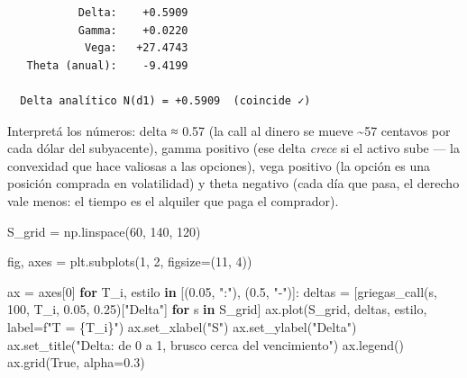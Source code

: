 \documentclass[
  spanish,
  letterpaper,
  DIV=11,
  numbers=noendperiod]{scrreprt}
\newenvironment{Shaded}{\begin{snugshade}}{\end{snugshade}}
\newcommand{\ControlFlowTok}[1]{\textcolor[rgb]{0.00,0.23,0.31}{\textbf{#1}}}
\newcommand{\DecValTok}[1]{\textcolor[rgb]{0.68,0.00,0.00}{#1}}
\newcommand{\FloatTok}[1]{\textcolor[rgb]{0.68,0.00,0.00}{#1}}
\newcommand{\KeywordTok}[1]{\textcolor[rgb]{0.00,0.23,0.31}{\textbf{#1}}}
\newcommand{\NormalTok}[1]{\textcolor[rgb]{0.00,0.23,0.31}{#1}}
\newcommand{\OperatorTok}[1]{\textcolor[rgb]{0.37,0.37,0.37}{#1}}
\newcommand{\SpecialCharTok}[1]{\textcolor[rgb]{0.37,0.37,0.37}{#1}}
\newcommand{\SpecialStringTok}[1]{\textcolor[rgb]{0.13,0.47,0.30}{#1}}
\newcommand{\StringTok}[1]{\textcolor[rgb]{0.13,0.47,0.30}{#1}}
\newcommand{\VariableTok}[1]{\textcolor[rgb]{0.07,0.07,0.07}{#1}}
\begin{document}
\begin{verbatim}
           Delta:    +0.5909
           Gamma:    +0.0220
            Vega:   +27.4743
   Theta (anual):    -9.4199

  Delta analítico N(d1) = +0.5909  (coincide ✓)
\end{verbatim}

Interpretá los números: delta ≈ 0.57 (la call al dinero se mueve
\textasciitilde57 centavos por cada dólar del subyacente), gamma
positivo (ese delta \emph{crece} si el activo sube --- la convexidad que
hace valiosas a las opciones), vega positivo (la opción es una posición
comprada en volatilidad) y theta negativo (cada día que pasa, el derecho
vale menos: el tiempo es el alquiler que paga el comprador).

\begin{Shaded}
\begin{Highlighting}[]
\NormalTok{S\_grid }\OperatorTok{=}\NormalTok{ np.linspace(}\DecValTok{60}\NormalTok{, }\DecValTok{140}\NormalTok{, }\DecValTok{120}\NormalTok{)}

\NormalTok{fig, axes }\OperatorTok{=}\NormalTok{ plt.subplots(}\DecValTok{1}\NormalTok{, }\DecValTok{2}\NormalTok{, figsize}\OperatorTok{=}\NormalTok{(}\DecValTok{11}\NormalTok{, }\DecValTok{4}\NormalTok{))}

\NormalTok{ax }\OperatorTok{=}\NormalTok{ axes[}\DecValTok{0}\NormalTok{]}
\ControlFlowTok{for}\NormalTok{ T\_i, estilo }\KeywordTok{in}\NormalTok{ [(}\FloatTok{0.05}\NormalTok{, }\StringTok{":"}\NormalTok{), (}\FloatTok{0.5}\NormalTok{, }\StringTok{"{-}"}\NormalTok{)]:}
\NormalTok{    deltas }\OperatorTok{=}\NormalTok{ [griegas\_call(s, }\DecValTok{100}\NormalTok{, T\_i, }\FloatTok{0.05}\NormalTok{, }\FloatTok{0.25}\NormalTok{)[}\StringTok{"Delta"}\NormalTok{] }\ControlFlowTok{for}\NormalTok{ s }\KeywordTok{in}\NormalTok{ S\_grid]}
\NormalTok{    ax.plot(S\_grid, deltas, estilo, label}\OperatorTok{=}\SpecialStringTok{f"T = }\SpecialCharTok{\{}\NormalTok{T\_i}\SpecialCharTok{\}}\SpecialStringTok{"}\NormalTok{)}
\NormalTok{ax.set\_xlabel(}\StringTok{"S"}\NormalTok{)}
\NormalTok{ax.set\_ylabel(}\StringTok{"Delta"}\NormalTok{)}
\NormalTok{ax.set\_title(}\StringTok{"Delta: de 0 a 1, brusco cerca del vencimiento"}\NormalTok{)}
\NormalTok{ax.legend()}
\NormalTok{ax.grid(}\VariableTok{True}\NormalTok{, alpha}\OperatorTok{=}\FloatTok{0.3}\NormalTok{)}


\end{Highlighting}
\end{Shaded}
\end{document}
